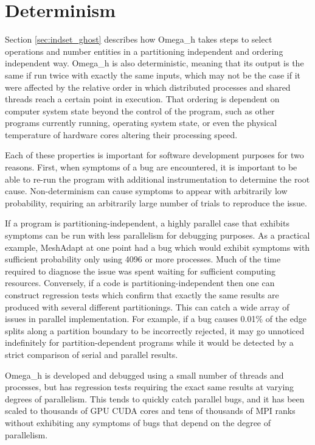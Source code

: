 \section{Determinism}
\label{sec:determinism}

Section \ref{sec:indset_ghost} describes how Omega\_h takes steps
to select operations and number entities in a partitioning independent and
ordering independent way.
Omega\_h is also deterministic,
meaning that its output is the same if run twice with exactly
the same inputs, which may not be the case if it were affected
by the relative order in which distributed processes and shared
threads reach a certain point in execution.
That ordering is dependent
on computer system state beyond the control of the program,
such as other programs currently running, operating system
state, or even the physical temperature of hardware cores
altering their processing speed.

Each of these properties is important
for software development purposes for two reasons.
First, when symptoms of a bug are encountered,
it is important to be able to re-run the program with
additional instrumentation to determine the root cause.
Non-determinism can cause symptoms to appear with arbitrarily
low probability, requiring an arbitrarily large number of
trials to reproduce the issue.

If a program is partitioning-independent, a highly parallel
case that exhibits symptoms can be run with less parallelism
for debugging purposes.
As a practical example, MeshAdapt at one point had a bug
which would exhibit symptoms with sufficient probability
only using 4096 or more processes.
Much of the time required to diagnose the issue was spent
waiting for sufficient computing resources.
Conversely, if a code is partitioning-independent then
one can construct regression tests which confirm that
exactly the same results are produced with several different
partitionings.
This can catch a wide array of issues in parallel implementation.
For example, if a bug causes 0.01\% of the edge splits
along a partition boundary to be incorrectly rejected,
it may go unnoticed indefinitely for partition-dependent programs
while it would be detected by a strict comparison
of serial and parallel results.

Omega\_h is developed and debugged using a small number
of threads and processes, but has regression tests requiring
the exact same results at varying degrees of parallelism.
This tends to quickly catch parallel bugs, and it has
been scaled to thousands of GPU CUDA cores and tens of
thousands of MPI ranks without exhibiting any symptoms of
bugs that depend on the degree of parallelism.


